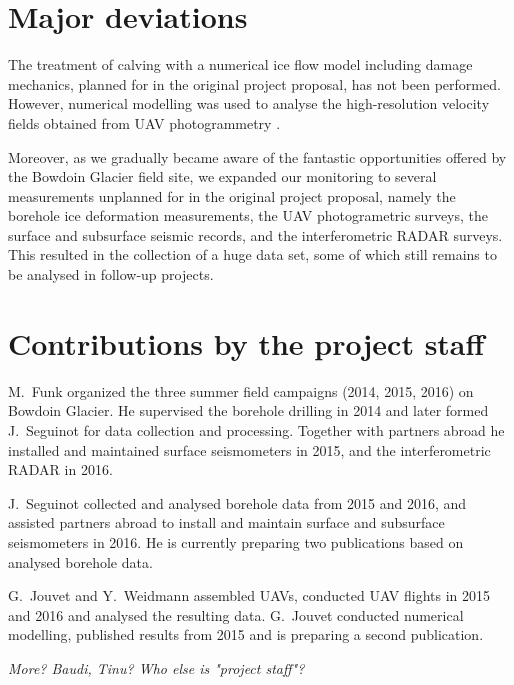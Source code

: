 \documentclass{article}
\begin{document}
\section{Major deviations}

The treatment of calving with a numerical ice flow model including damage
mechanics, planned for in the original project proposal, has not been
performed. However, numerical modelling was used to analyse the high-resolution
velocity fields obtained from UAV photogrammetry \citep{Jouvet.etal.2016}.

Moreover, as we gradually became aware of the fantastic opportunities offered
by the Bowdoin Glacier field site, we expanded our monitoring to several
measurements unplanned for in the original project proposal, namely the
borehole ice deformation measurements, the UAV photogrametric surveys, the
surface and subsurface seismic records, and the interferometric RADAR surveys.
This resulted in the collection of a huge data set, some of which still remains
to be analysed in follow-up projects.


\section{Contributions by the project staff}

M.~Funk organized the three summer field campaigns (2014, 2015, 2016) on
Bowdoin Glacier. He supervised the borehole drilling in 2014 and later formed
J.~Seguinot for data collection and processing. Together with partners abroad
he installed and maintained surface seismometers in 2015, and the
interferometric RADAR in 2016.

J.~Seguinot collected and analysed borehole data from 2015 and 2016, and
assisted partners abroad to install and maintain surface and subsurface
seismometers in 2016. He is currently preparing two publications based on
analysed borehole data.

G.~Jouvet and Y.~Weidmann assembled UAVs, conducted UAV flights in 2015 and
2016 and analysed the resulting data. G.~Jouvet conducted numerical modelling,
published results from 2015 and is preparing a second publication.

\emph{More? Baudi, Tinu? Who else is "project staff"?}


\end{document}
